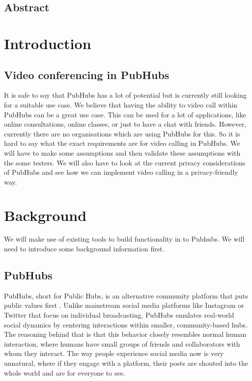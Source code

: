 \documentclass{report}
\begin{document}
\tableofcontents

\newpage
\section*{Abstract}


\chapter{Introduction}


\section{Video conferencing in PubHubs}
It is safe to say that PubHubs has a lot of potential but is currently still looking for a suitable use case. We
believe that having the ability to video call within PubHubs can be a great use case. This can be used for a lot of
applications, like online consultations, online classes, or just to have a chat with friends. However, currently
there are no organisations which are using PubHubs for this. So it is hard to say what the exact requirements are
for video calling in PubHubs.
We will have to make some assumptions and then validate these assumptions with the
some testers. We will also have to look at the current privacy
considerations of PubHubs and see how we can implement video calling in a privacy-friendly way.


\chapter{Background}
We will make use of existing tools to build functionality in to Pubhubs. We will need to introduce some background
information first.


\section{PubHubs}
PubHubs, short for Public Hubs, is an alternative community platform that puts public values first
\cite{jacobs_pubhubs_2023}
. Unlike mainstream social media platforms like Instagram or Twitter that focus on individual broadcasting, PubHubs
emulates real-world social dynamics by centering interactions within smaller, community-based hubs. The reasoning
behind that is that this behavior closely resembles normal human interaction, where humans have small groups of
friends and collaborators with whom they interact. The way people experience social media now is very unnatural,
where if they engage with a platform, their posts are shouted into the whole world and are for everyone to see.
\end{document}

